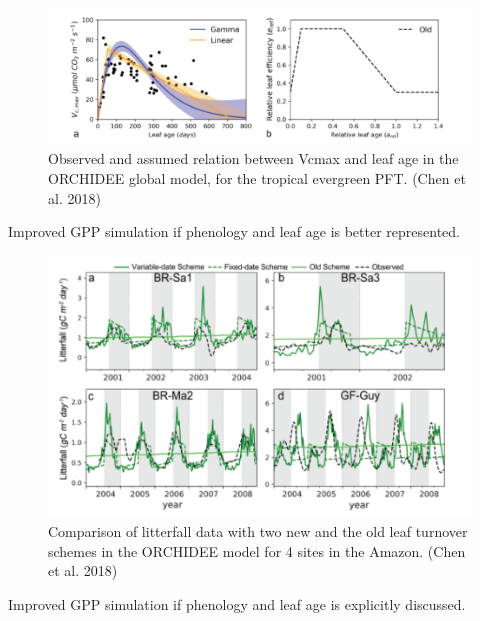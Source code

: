\documentclass[12pt,oneside]{book}
\begin{document}
\begin{figure}

{\centering \includegraphics[width=0.8\linewidth]{figures/chap4/f411_chen1} 

}

\caption{Observed and assumed relation between Vcmax and leaf age in the ORCHIDEE global model, for the tropical evergreen PFT. (Chen et al. 2018)}\label{fig:f411}
\end{figure}

Improved GPP simulation if phenology and leaf age is better represented.

\begin{figure}

{\centering \includegraphics[width=0.8\linewidth]{figures/chap4/f412_chen2} 

}

\caption{Comparison of litterfall data with two new and the old leaf turnover schemes in the ORCHIDEE model for 4 sites in the Amazon. (Chen et al. 2018)}\label{fig:f412}
\end{figure}

Improved GPP simulation if phenology and leaf age is explicitly
discussed.
\end{document}
